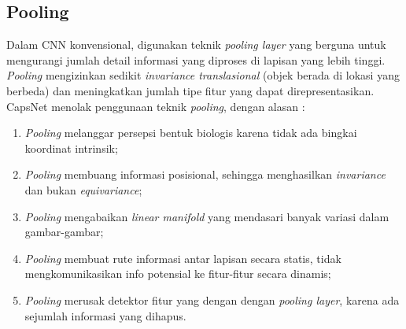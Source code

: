 \documentclass{article}
\begin{document}
   	\subsection{Pooling}
   	Dalam CNN konvensional, digunakan teknik \textit{pooling layer} yang berguna untuk mengurangi jumlah detail informasi yang diproses di lapisan yang lebih tinggi. \textit{Pooling} mengizinkan sedikit \textit{invariance translasional} (objek berada di lokasi yang berbeda) dan meningkatkan jumlah tipe fitur yang dapat direpresentasikan. CapsNet menolak penggunaan teknik \textit{pooling}, dengan alasan :
   	
   	\begin{enumerate}
   	 \item \textit{Pooling} melanggar persepsi bentuk biologis karena tidak ada bingkai koordinat intrinsik;
   	 \item \textit{Pooling} membuang informasi posisional, sehingga menghasilkan \textit{invariance} dan bukan \textit{equivariance};
   	 \item \textit{Pooling} mengabaikan \textit{linear manifold} yang mendasari banyak variasi dalam gambar-gambar;
   	 \item \textit{Pooling} membuat rute informasi antar lapisan secara statis, tidak mengkomunikasikan info potensial ke fitur-fitur secara dinamis;
   	 \item \textit{Pooling} merusak detektor fitur yang dengan dengan \textit{pooling layer}, karena ada sejumlah informasi yang dihapus.
   	\end{enumerate}
   	
\end{document}
